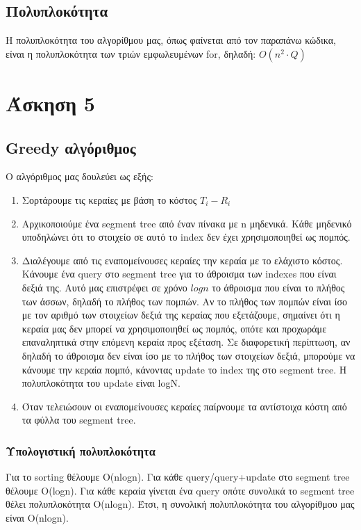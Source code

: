 \documentclass[a4paper,oneside, 11pt]{article}
\begin{document}
\subsection*{Πολυπλοκότητα}

Η πολυπλοκότητα του αλγορίθμου μας, όπως φαίνεται από τον παραπάνω κώδικα, είναι η πολυπλοκότητα των τριών εμφωλευμένων for, δηλαδή: $O(n^2\cdot Q)$
\section*{Άσκηση 5}

\subsection*{Greedy αλγόριθμος}
Ο αλγόριθμος μας δουλεύει ως εξής:
\begin{enumerate}
	\item Σορτάρουμε τις κεραίες με βάση το κόστος $T_i - R_i$
	\item Αρχικοποιούμε ένα segment tree από έναν πίνακα με n μηδενικά. Κάθε μηδενικό υποδηλώνει ότι το στοιχείο σε αυτό το index δεν έχει χρησιμοποιηθεί ως πομπός.
	\item Διαλέγουμε από τις εναπομείνουσες κεραίες την κεραία με το ελάχιστο κόστος. Κάνουμε ένα query στο segment tree για το άθροισμα των indexes που είναι δεξιά της. Αυτό μας επιστρέφει σε χρόνο $logn$ το άθροισμα που είναι το πλήθος των άσσων, δηλαδή το πλήθος των πομπών. Αν το πλήθος των πομπών είναι ίσο με τον αριθμό των στοιχείων δεξιά της κεραίας που εξετάζουμε, σημαίνει ότι η κεραία μας δεν μπορεί να χρησιμοποιηθεί ως πομπός, οπότε και προχωράμε επαναληπτικά στην επόμενη κεραία προς εξέταση. Σε διαφορετική περίπτωση, αν δηλαδή το άθροισμα δεν είναι ίσο με το πλήθος των στοιχείων δεξιά, μπορούμε να κάνουμε την κεραία πομπό, κάνοντας update το index της στο segment tree. Η πολυπλοκότητα του update είναι logN.
	\item Όταν τελειώσουν οι εναπομείνουσες κεραίες παίρνουμε τα αντίστοιχα κόστη από τα φύλλα του segment tree.
\end{enumerate}
\subsubsection*{Υπολογιστική πολυπλοκότητα}
Για το sorting θέλουμε O(nlogn). Για κάθε query/query+update στο segment tree θέλουμε O(logn). Για κάθε κεραία γίνεται ένα query οπότε συνολικά το segment tree θέλει πολυπλοκότητα O(nlogn). Έτσι, η συνολική πολυπλοκότητα του αλγορίθμου μας είναι O(nlogn).
\end{document}
